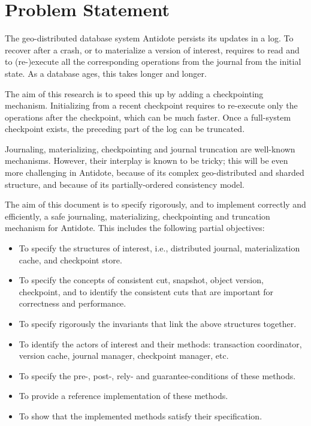 \documentclass[twoside]{article}
\begin{document}
\makeRR   %

\section{Problem Statement}
\label{sec:problem-statement}
The geo-distributed database system Antidote persists its
updates in a log.
To recover after a crash, or to materialize a version of interest,
requires to read and to (re-)execute all the corresponding operations
from the journal from the initial state.
As a database ages, this takes longer and longer.

The aim of this research is to speed this up by adding a checkpointing
mechanism.
Initializing from a recent checkpoint requires to re-execute only
the operations after the checkpoint, which can be much faster.
Once a full-system checkpoint exists, the preceding part of the log can
be truncated.

Journaling, materializing, checkpointing and journal truncation are
well-known mechanisms.
However, their interplay is known to be tricky; this will be even more
challenging in Antidote, because of its complex geo-distributed and
sharded structure, and because of its partially-ordered consistency
model.

The aim of this document is to specify rigorously, and to implement
correctly and efficiently, a safe journaling, materializing,
checkpointing and truncation mechanism for Antidote.
This includes the following partial objectives:
\begin{itemize}
\item
  To specify the structures of interest, i.e., distributed journal,
  materialization cache, and checkpoint store.
\item
  To specify the concepts of consistent cut, snapshot, object version,
  checkpoint, and to identify the consistent cuts that are important for
  correctness and performance.
\item
  To specify rigorously the invariants that link the above structures
  together.
\item
  To identify the actors of interest and their methods: transaction
  coordinator, version cache, journal manager, checkpoint manager, etc.
\item
  To specify the pre-, post-, rely- and guarantee-conditions of these
  methods.
\item
  To provide a reference implementation of these methods.
\item
  To show that the implemented methods satisfy their specification.
\end{itemize}
\end{document}
